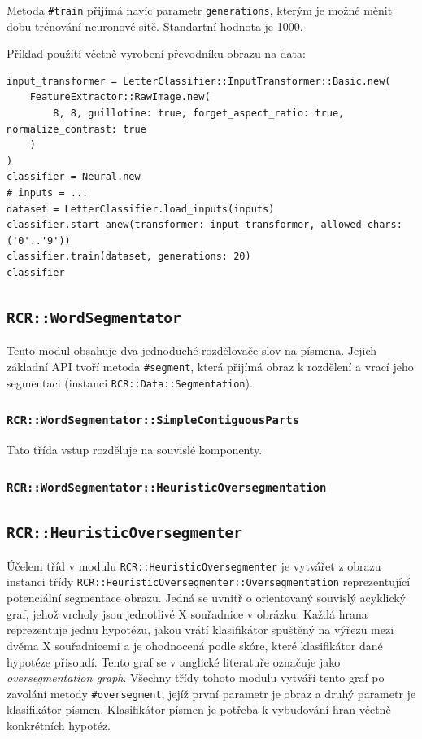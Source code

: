 \documentclass[a4paper]{article}
\begin{document}
Metoda \texttt{\#train} přijímá navíc parametr \texttt{generations},
kterým je možné měnit dobu trénování neuronové sítě. Standartní hodnota
je 1000.

Příklad použití včetně vyrobení převodníku obrazu na data:
\begin{lstlisting}
input_transformer = LetterClassifier::InputTransformer::Basic.new(
	FeatureExtractor::RawImage.new(
		8, 8, guillotine: true, forget_aspect_ratio: true, normalize_contrast: true
	)
)
classifier = Neural.new
# inputs = ...
dataset = LetterClassifier.load_inputs(inputs)
classifier.start_anew(transformer: input_transformer, allowed_chars: ('0'..'9'))
classifier.train(dataset, generations: 20)
classifier
\end{lstlisting}

\subsection{\texttt{RCR::WordSegmentator}}
Tento modul obsahuje dva jednoduché rozdělovače slov na písmena.
Jejich základní API tvoří metoda \texttt{\#segment}, která přijímá obraz k
rozdělení a vrací jeho segmentaci (instanci \texttt{RCR::Data::Segmentation}).

\subsubsection{\texttt{RCR::WordSegmentator::SimpleContiguousParts}}
Tato třída vstup rozděluje na souvislé komponenty.

\subsubsection{\texttt{RCR::WordSegmentator::HeuristicOversegmentation}}

\subsection{\texttt{RCR::HeuristicOversegmenter}}
Účelem tříd v modulu \texttt{RCR::HeuristicOversegmenter} je vytvářet z obrazu
instanci třídy \texttt{RCR::HeuristicOversegmenter::Oversegmentation}
reprezentující potenciální segmentace obrazu. Jedná se uvnitř o orientovaný
souvislý acyklický graf, jehož vrcholy jsou jednotlivé X souřadnice v obrázku.
Každá hrana reprezentuje jednu hypotézu, jakou vrátí klasifikátor spuštěný na
výřezu mezi dvěma X souřadnicemi a je ohodnocená podle skóre, které klasifikátor
dané hypotéze přisoudí. Tento graf se v anglické literatuře označuje jako
\textit{oversegmentation graph}.
Všechny třídy tohoto modulu vytváří tento graf po zavolání metody
\texttt{\#oversegment}, jejíž první parametr je obraz a druhý parametr je
klasifikátor písmen. Klasifikátor písmen je potřeba k vybudování hran včetně
konkrétních hypotéz.
\end{document}
